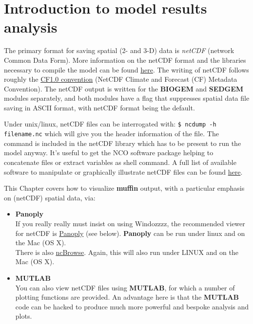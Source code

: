 \documentclass[11pt,fleqn]{book} %
\begin{document}
\chapter{Introduction to model results analysis}\label{ch:results-analysis}

\hfill \break

\vspace{21mm}

\noindent The primary format for saving spatial (2- and 3-D) data is \textit{netCDF} (network Common Data Form). More information on the netCDF format and the libraries necessary to compile the model can be found \href{http://www.unidata.ucar.edu/software/netcdf}{here}.
The writing of netCDF follows roughly the \href{http://www.cgd.ucar.edu/cms/eaton/cf-metadata/index.html}{CF1.0 convention} (NetCDF Climate and Forecast (CF) Metadata Convention).
The netCDF output is written for  the \textbf{BIOGEM} and \textbf{SEDGEM} modules separately, and both modules have a flag that suppresses spatial data file saving in ASCII format, with netCDF format being the default.

Under unix/linux, netCDF files can be interrogated with: \texttt{\$ ncdump -h filename.nc} which will give you the header information of the file. The command is included in the netCDF library which has to be present to run the model anyway. It's useful to get the NCO software package helping to concatenate files or extract variables as shell command. A full list of available software to manipulate or graphically illustrate netCDF files can be found \href{http://www.unidata.ucar.edu/software/netcdf/software.html}{here}.

\vspace{4pt}
This Chapter covers how to visualize \textbf{muffin} output, with a particular emphasis on (netCDF) spatial data, via:

\vspace{2pt}
\begin{itemize}
\vspace{1pt}
\item \textbf{Panoply}
\\ If you really really must insist on using Windozzzz, the recommended viewer for netCDF is \href{http://www.giss.nasa.gov/tools/panoply/}{Panoply} (see below). \textbf{Panoply} can be run under linux and on the Mac (OS X).
\\ There is also \href{http://www.epic.noaa.gov/java/ncBrowse/}{ncBrowse}. Again, this will also run under LINUX and on the Mac (OS X).
\vspace{1pt}
\item \textbf{MUTLAB}
\\ You can also view netCDF files using \textbf{MUTLAB}, for which a number of plotting functions are provided. An advantage here is that the \textbf{MUTLAB} code can be hacked to produce much more powerful and bespoke analysis and plots.
\end{itemize}
\end{document}
